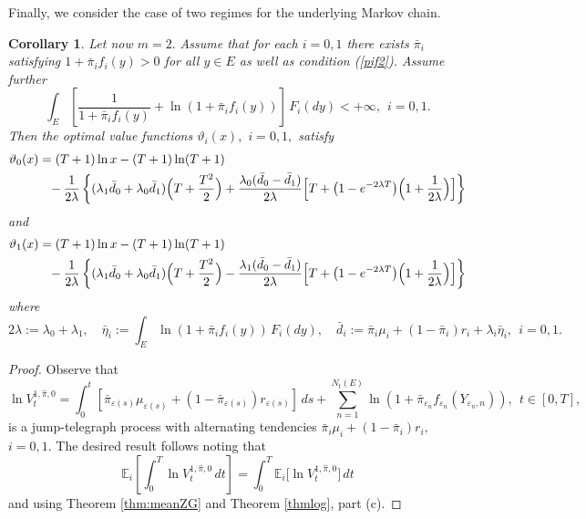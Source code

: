 \documentclass[11pt]{article}
\theoremstyle{plain}
\newtheorem{corollary}[theorem]{Corollary}
\theoremstyle{definition}
\numberwithin{equation}{section}
\newcommand{\eps}{\varepsilon}
\newcommand{\Exp}{\mathds{E}}
\begin{document}
Finally, we consider the case of two regimes for the underlying Markov chain.
\begin{corollary}
Let now $m=2.$ Assume that for each $i=0,1$ there exists $\bar{\pi}_i$ satisfying $1+\bar{\pi}_if_i(y)>0$ for all $y\in E$ as well as condition (\ref{pif2}). Assume further
\[
\int_E \left[\frac{1}{1+\bar\pi_i f_i(y)}+\ln(1+\bar\pi_if_i(y))\right]\,F_i(dy)<+\infty, \ \ i=0,1.
\]
Then the optimal value functions $\vartheta_i(x),$ $i=0,1,$ satisfy
\begin{align*}
\vartheta_0(x)&=(T+1)\ln x-(T+1)\ln (T+1)\\
&\phantom{=}-\frac{1}{2\lambda}\left\{(\lambda_1\bar{d}_0+\lambda_0\bar{d}_1)\Bigl(T+\frac{T^2}{2}\Bigr)
+\frac{\lambda_0(\bar{d}_0-\bar{d}_1)}{2\lambda}\Bigl[T+\bigl(1-e^{-2\lambda T}\bigr)\Bigl(1+\frac{1}{2\lambda}\Bigr)\Bigr]\right\}
\end{align*}
and
\begin{align*}
\vartheta_1(x)&=(T+1)\ln x-(T+1)\ln (T+1)\\
&\phantom{=}-\frac{1}{2\lambda}\left\{(\lambda_1\bar{d}_0+\lambda_0\bar{d}_1)\Bigl(T+\frac{T^2}{2}\Bigr)
-\frac{\lambda_1(\bar{d}_0-\bar{d}_1)}{2\lambda}\Bigl[T+\bigl(1-e^{-2\lambda T}\bigr)\Bigl(1+\frac{1}{2\lambda}\Bigr)\Bigr]\right\}
\end{align*}
where
\begin{equation*}
2\lambda:=\lambda_0+\lambda_1,\quad \bar\eta_i:=\int_{E} \ln(1+\bar\pi_if_i(y))\,F_i(dy),\quad\bar{d}_i:=\bar{\pi}_i\mu_i+(1-\bar\pi_i)r_i+\lambda_i\bar{\eta}_i, \ \ i=0,1.
\end{equation*}
\end{corollary}

\begin{proof}
Observe that
\[
\ln V_t^{1,\hat{\pi},0}=\int_0^t\left[\bar{\pi}_{\eps(s)}\mu_{\eps(s)}+\left(1-\bar\pi_{\eps(s)}\right)r_{\eps(s)}\right]\,ds
+\sum_{n=1}^{N_t(E)}\ln(1+\bar{\pi}_{\eps_n}f_{\eps_n}(Y_{\eps_n,n})), \ \ t\in[0,T],
\]
is a jump-telegraph process with alternating tendencies $\bar{\pi}_i\mu_i+(1-\bar\pi_i)r_i,$ $i=0,1.$ The desired result follows noting that
\[
\Exp_i\left[\int_0^T\ln V_t^{1,\hat{\pi},0}\,dt\right]=\int_0^T\Exp_i\bigl[\ln V_t^{1,\hat{\pi},0}]\,dt
\]
and using Theorem \ref{thm:meanZG} and Theorem \ref{thmlog}, part (c).
\end{proof}
\end{document}
